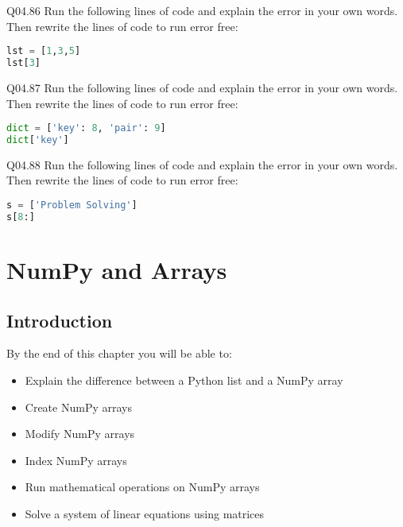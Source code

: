 \documentclass{book}
\newenvironment{problems}{}{}  %
\begin{document}
\begin{problems}
Q04.86 Run the following lines of code and explain the error in your own
words. Then rewrite the lines of code to run error free:

\begin{lstlisting}[language=Python]
lst = [1,3,5]
lst[3]
\end{lstlisting}

Q04.87 Run the following lines of code and explain the error in your own
words. Then rewrite the lines of code to run error free:

\begin{lstlisting}[language=Python]
dict = ['key': 8, 'pair': 9]
dict['key']
\end{lstlisting}

Q04.88 Run the following lines of code and explain the error in your own
words. Then rewrite the lines of code to run error free:

\begin{lstlisting}[language=Python]
s = ['Problem Solving']
s[8:]
\end{lstlisting}
        \end{problems}

    




    
        \hypertarget{numpy-and-arrays}{%
\chapter{NumPy and Arrays}\label{numpy-and-arrays}}
    




    
        \hypertarget{introduction}{%
\section{Introduction}\label{introduction}}
    




    
        By the end of this chapter you will be able to:

\begin{itemize}
\item
  Explain the difference between a Python list and a NumPy array
\item
  Create NumPy arrays
\item
  Modify NumPy arrays
\item
  Index NumPy arrays
\item
  Run mathematical operations on NumPy arrays
\item
  Solve a system of linear equations using matrices
\end{itemize}
        \newpage
\end{document}
